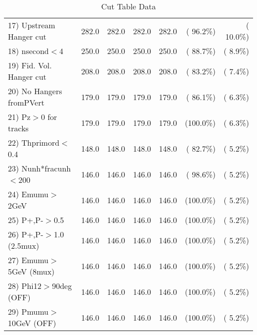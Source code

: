 \begin{table}[h!]
\begin{tabular}{||l||r|r|r|r|r|r||}
 17) Upstream Hanger cut  &        282.0 &        282.0 &        282.0 &        282.0 & ( 96.2\%) & ( 10.0\%) \\
 18) nsecond$<$4          &        250.0 &        250.0 &        250.0 &        250.0 & ( 88.7\%) & (  8.9\%) \\
 19) Fid. Vol. Hanger cut &        208.0 &        208.0 &        208.0 &        208.0 & ( 83.2\%) & (  7.4\%) \\
 20) No Hangers fromPVert &        179.0 &        179.0 &        179.0 &        179.0 & ( 86.1\%) & (  6.3\%) \\
 21) Pz$>$0 for tracks    &        179.0 &        179.0 &        179.0 &        179.0 & (100.0\%) & (  6.3\%) \\
 22) Thprimord$<$0.4      &        148.0 &        148.0 &        148.0 &        148.0 & ( 82.7\%) & (  5.2\%) \\
 23) Nunh*fracunh$<$200   &        146.0 &        146.0 &        146.0 &        146.0 & ( 98.6\%) & (  5.2\%) \\
 24) Emumu$>$2GeV         &        146.0 &        146.0 &        146.0 &        146.0 & (100.0\%) & (  5.2\%) \\
 25) P+,P-$>$0.5          &        146.0 &        146.0 &        146.0 &        146.0 & (100.0\%) & (  5.2\%) \\
 26) P+,P-$>$1.0 (2.5mux) &        146.0 &        146.0 &        146.0 &        146.0 & (100.0\%) & (  5.2\%) \\
 27) Emumu$>$5GeV  (8mux) &        146.0 &        146.0 &        146.0 &        146.0 & (100.0\%) & (  5.2\%) \\
 28) Phi12$>$90deg  (OFF) &        146.0 &        146.0 &        146.0 &        146.0 & (100.0\%) & (  5.2\%) \\
 29) Pmumu$>$10GeV  (OFF) &        146.0 &        146.0 &        146.0 &        146.0 & (100.0\%) & (  5.2\%) \\
 \hline
 \hline
 \end{tabular}
 \caption{Cut Table  Data     }
 \label{tab-cutcohjpsi-mumu_data}
 \end{table}

